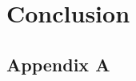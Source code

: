 \documentclass[UKenglish]{book}
\begin{document}
%

%

% 
% 
% 



\chapter*{Conclusion}\label{chap:conclusion}

\backmatter{}

\begin{appendices}

\appendix
\chapter{Appendix A}
\renewcommand{\thechapter}{A}
\renewcommand{\theequation}{\thechapter.\arabic{equation}}



% 
%
% 
%
% 


\end{appendices}





\end{document}
